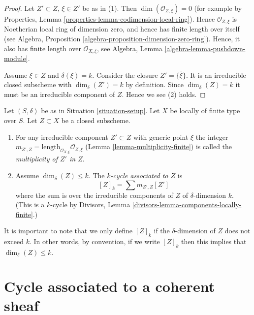 \begin{proof}
Let $Z' \subset Z$, $\xi \in Z'$ be as in (1).
Then $\dim(\mathcal{O}_{Z, \xi}) = 0$ (for example by
Properties, Lemma \ref{properties-lemma-codimension-local-ring}).
Hence $\mathcal{O}_{Z, \xi}$ is Noetherian
local ring of dimension zero, and hence has finite length over
itself (see
Algebra, Proposition \ref{algebra-proposition-dimension-zero-ring}).
Hence, it also has finite length over $\mathcal{O}_{X, \xi}$, see
Algebra, Lemma \ref{algebra-lemma-pushdown-module}.

\medskip\noindent
Assume $\xi \in Z$ and $\delta(\xi) = k$.
Consider the closure $Z' = \overline{\{\xi\}}$. It is an irreducible
closed subscheme with $\dim_\delta(Z') = k$ by definition.
Since $\dim_\delta(Z) = k$ it must be an irreducible component
of $Z$. Hence we see (2) holds.
\end{proof}

\begin{definition}
\label{definition-cycle-associated-to-closed-subscheme}
Let $(S, \delta)$ be as in Situation \ref{situation-setup}.
Let $X$ be locally of finite type over $S$.
Let $Z \subset X$ be a closed subscheme.
\begin{enumerate}
\item For any irreducible component $Z' \subset Z$ with generic point $\xi$
the integer
$m_{Z', Z} = \text{length}_{\mathcal{O}_{X, \xi}} \mathcal{O}_{Z, \xi}$
(Lemma \ref{lemma-multiplicity-finite})
is called the {\it multiplicity of $Z'$ in $Z$}.
\item Assume $\dim_\delta(Z) \leq k$.
The {\it $k$-cycle associated to $Z$} is
$$
[Z]_k
=
\sum m_{Z', Z}[Z']
$$
where the sum is over the irreducible components of $Z$
of $\delta$-dimension $k$. (This is a $k$-cycle by
Divisors, Lemma \ref{divisors-lemma-components-locally-finite}.)
\end{enumerate}
\end{definition}

\noindent
It is important to note that we only define $[Z]_k$ if the $\delta$-dimension
of $Z$ does not exceed $k$. In other words, by convention, if we write
$[Z]_k$ then this implies that $\dim_\delta(Z) \leq k$.



\section{Cycle associated to a coherent sheaf}
\label{section-cycle-of-coherent-sheaf}



